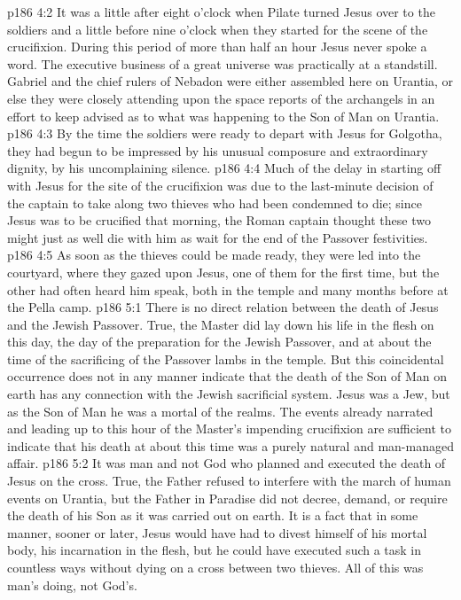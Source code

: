 \vs p186 4:2 It was a little after eight o’clock when Pilate turned Jesus over to the soldiers and a little before nine o’clock when they started for the scene of the crucifixion. During this period of more than half an hour Jesus never spoke a word. The executive business of a great universe was practically at a standstill. Gabriel and the chief rulers of Nebadon were either assembled here on Urantia, or else they were closely attending upon the space reports of the archangels in an effort to keep advised as to what was happening to the Son of Man on Urantia.
\vs p186 4:3 By the time the soldiers were ready to depart with Jesus for Golgotha, they had begun to be impressed by his unusual composure and extraordinary dignity, by his uncomplaining silence.
\vs p186 4:4 Much of the delay in starting off with Jesus for the site of the crucifixion was due to the last\hyp{}minute decision of the captain to take along two thieves who had been condemned to die; since Jesus was to be crucified that morning, the Roman captain thought these two might just as well die with him as wait for the end of the Passover festivities.
\vs p186 4:5 As soon as the thieves could be made ready, they were led into the courtyard, where they gazed upon Jesus, one of them for the first time, but the other had often heard him speak, both in the temple and many months before at the Pella camp.
\vs p186 5:1 There is no direct relation between the death of Jesus and the Jewish Passover. True, the Master did lay down his life in the flesh on this day, the day of the preparation for the Jewish Passover, and at about the time of the sacrificing of the Passover lambs in the temple. But this coincidental occurrence does not in any manner indicate that the death of the Son of Man on earth has any connection with the Jewish sacrificial system. Jesus was a Jew, but as the Son of Man he was a mortal of the realms. The events already narrated and leading up to this hour of the Master’s impending crucifixion are sufficient to indicate that his death at about this time was a purely natural and man\hyp{}managed affair.
\vs p186 5:2 It was man and not God who planned and executed the death of Jesus on the cross. True, the Father refused to interfere with the march of human events on Urantia, but the Father in Paradise did not decree, demand, or require the death of his Son as it was carried out on earth. It is a fact that in some manner, sooner or later, Jesus would have had to divest himself of his mortal body, his incarnation in the flesh, but he could have executed such a task in countless ways without dying on a cross between two thieves. All of this was man’s doing, not God’s.

